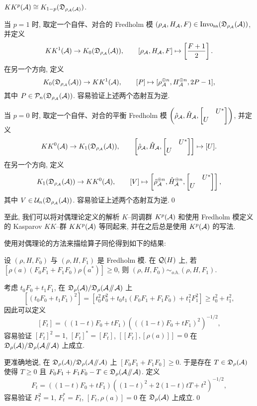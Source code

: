 \begin{Proposition}
	$ KK^p(\mathcal{A})\cong K_{1-p}(\mathfrak{D}_{\rho_{\mathcal{A}}(\mathcal{A})}) $.
\end{Proposition}
\begin{Proof}
	当 $ p=1 $ 时, 取定一个自伴、对合的 Fredholm 模 $ (\rho_{\mathcal{A}}, H_{\mathcal{A}}, F)\in\text{Invo}_{\text{sa}}(\mathfrak{D}_{\rho_{\mathcal{A}}}(\mathcal{A})) $, 并定义
	\[
		KK^1(\mathcal{A})\to K_0(\mathfrak{D}_{\rho_{\mathcal{A}}}(\mathcal{A})),\qquad [\rho_{\mathcal{A}}, H_{\mathcal{A}}, F]\mapsto\left[\frac{F+1}{2}\right].
	\]
	在另一个方向, 定义
	\[
		K_0(\mathfrak{D}_{\rho_{\mathcal{A}}}(\mathcal{A}))\to KK^1(\mathcal{A}),\qquad [P]\mapsto[\rho_{\mathcal{A}}^{\oplus n}, H_{\mathcal{A}}^{\oplus n}, 2P-1],
	\]
	其中 $ P\in\mathcal{P}_n(\mathfrak{D}_{\rho_{\mathcal{A}}}(\mathcal{A})) $. 容易验证上述两个态射互为逆.

	当 $ p=0 $ 时, 取定一个自伴、对合的平衡 Fredholm 模 $ \left(\hat{\rho}_{\CA},\hat{H}_{\CA},\mqty[ & U^* \\ U &]\right) $, 并定义
	\[
		KK^0(\CA)\to K_1(\FD_{\rho_{\CA}}(\CA)),\qquad \left[\hat{\rho}_{\CA},\hat{H}_{\CA},\mqty[ & U^* \\ U &]\right]\mapsto[U].
	\]
	在另一个方向, 定义
	\[
		K_1(\FD_{\rho_{\CA}}(\CA))\to KK^0(\CA),\qquad [V]\mapsto\left[\hat{\rho}_{\CA}^{\oplus n}, \hat{H}_{\CA}^{\oplus n}, \mqty[ & U^* \\ U &]\right],
	\]
	其中 $ V\in\mathcal{U}_n(\mathfrak{D}_{\rho_{\mathcal{A}}}(\mathcal{A})) $. 容易验证上述两个态射互为逆.\qed
\end{Proof}

至此, 我们可以将对偶理论定义的解析 $ K $--同调群 $ K^p(\mathcal{A}) $ 和使用 Fredholm 模定义的 Kasparov $ KK $--群 $ KK^p(\mathcal{A}) $ 等同起来, 并在之后总是使用 $ K^p(\mathcal{A}) $ 的写法.

使用对偶理论的方法来描绘算子同伦得到如下的结果:

\begin{Proposition}\label{prop:4.2-对偶理论算子同伦}
	设 $ (\rho, H, F_0) $ 与 $ (\rho, H, F_1) $ 是 Fredholm 模. 在 $ \mathcal{Q}(H) $ 上, 若 $ [\rho(a)(F_0F_1+F_1F_0)\rho(a^*)]\geqslant 0 $, 则 $ (\rho, H, F_0) \sim_{o.h.} (\rho, H, F_1) $.
\end{Proposition}
\begin{Proof}
	考虑 $ t_0F_0+t_1F_1 $, 在 $ \mathfrak{D}_{\rho}(\mathcal{A})/\mathfrak{D}_{\rho}(\mathcal{A}\mathbin{\!/\mkern-5mu/\!}\mathcal{A}) $ 上
	\[
		[(t_0F_0+t_1F_1)^2]=[t_0^2F_0^2+t_0t_1(F_0F_1+F_1F_0)+t_1^2F_1^2]\geqslant t_0^2+t_1^2,
	\]
	因此可以定义
	\[
		[F_t]=((1-t)F_0+tF_1)(((1-t)F_0+tF_1)^2)^{-1/2},
	\]
	容易验证 $ [F_t]^2=1 $, $ [F_t]^*=[F_t] $, $ [[F_t],[\rho(a)]]=0 $ 在 $ \mathfrak{D}_{\rho}(\mathcal{A})/\mathfrak{D}_{\rho}(\mathcal{A}\mathbin{\!/\mkern-5mu/\!}\mathcal{A}) $ 上成立. 
	
	更准确地说, 在 $ \mathfrak{D}_{\rho}(\mathcal{A})/\mathfrak{D}_{\rho}(\mathcal{A}\mathbin{\!/\mkern-5mu/\!}\mathcal{A}) $ 上 $ [F_0F_1+F_1F_0]\geqslant 0 $. 于是存在 $ T\in\mathfrak{D}_{\rho}(\mathcal{A}) $ 使得 $ T\geqslant 0 $ 且 $ F_0F_1+F_1F_0-T\in\mathfrak{D}_{\rho}(\mathcal{A}\mathbin{\!/\mkern-5mu/\!}\mathcal{A}) $. 定义
	\[
		F_t=((1-t)F_0+tF_1)((1-t)^2+2(1-t)tT+t^2)^{-1/2},
	\]
	容易验证 $ F_t^2=1 $, $ F_t^*=F_t $, $ [F_t,\rho(a)]=0 $ 在 $ \mathfrak{D}_\rho(\mathcal{A}) $ 上成立.\qed
\end{Proof}

